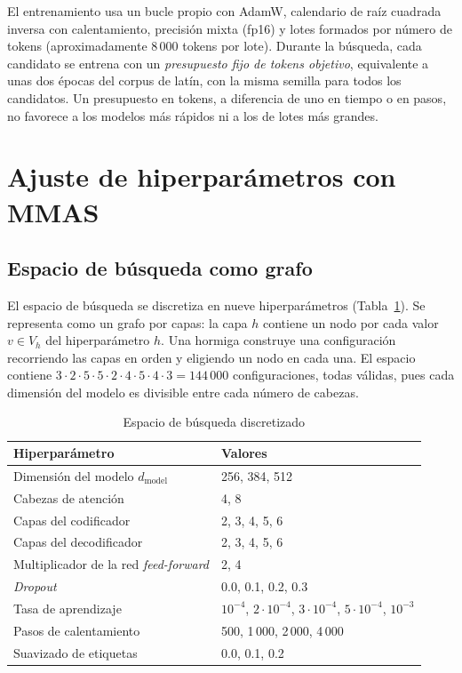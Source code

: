 \documentclass[conference]{IEEEtran}
\begin{document}
El entrenamiento usa un bucle propio con AdamW, calendario de raíz
cuadrada inversa con calentamiento, precisión mixta (fp16) y lotes
formados por número de tokens (aproximadamente 8\,000 tokens por lote).
Durante la búsqueda, cada candidato se entrena con un \emph{presupuesto
fijo de tokens objetivo}, equivalente a unas dos épocas del corpus de
latín, con la misma semilla para todos los candidatos. Un presupuesto en
tokens, a diferencia de uno en tiempo o en pasos, no favorece a los
modelos más rápidos ni a los de lotes más grandes.

\section{Ajuste de hiperparámetros con MMAS}

\subsection{Espacio de búsqueda como grafo}
El espacio de búsqueda se discretiza en nueve hiperparámetros
(Tabla~\ref{tab:espacio}). Se representa como un grafo por capas: la capa
$h$ contiene un nodo por cada valor $v \in V_h$ del hiperparámetro $h$.
Una hormiga construye una configuración recorriendo las capas en orden y
eligiendo un nodo en cada una. El espacio contiene
$3 \cdot 2 \cdot 5 \cdot 5 \cdot 2 \cdot 4 \cdot 5 \cdot 4 \cdot 3 = 144\,000$
configuraciones, todas válidas, pues cada dimensión del modelo es
divisible entre cada número de cabezas.

\begin{table}[t]
\centering
\caption{Espacio de búsqueda discretizado}
\label{tab:espacio}
\begin{tabular}{ll}
\toprule
Hiperparámetro & Valores \\
\midrule
Dimensión del modelo $d_\text{model}$ & 256, 384, 512 \\
Cabezas de atención & 4, 8 \\
Capas del codificador & 2, 3, 4, 5, 6 \\
Capas del decodificador & 2, 3, 4, 5, 6 \\
Multiplicador de la red \emph{feed-forward} & 2, 4 \\
\emph{Dropout} & 0.0, 0.1, 0.2, 0.3 \\
Tasa de aprendizaje & $10^{-4}$, $2{\cdot}10^{-4}$, $3{\cdot}10^{-4}$, $5{\cdot}10^{-4}$, $10^{-3}$ \\
Pasos de calentamiento & 500, 1\,000, 2\,000, 4\,000 \\
Suavizado de etiquetas & 0.0, 0.1, 0.2 \\
\bottomrule
\end{tabular}
\end{table}
\end{document}
